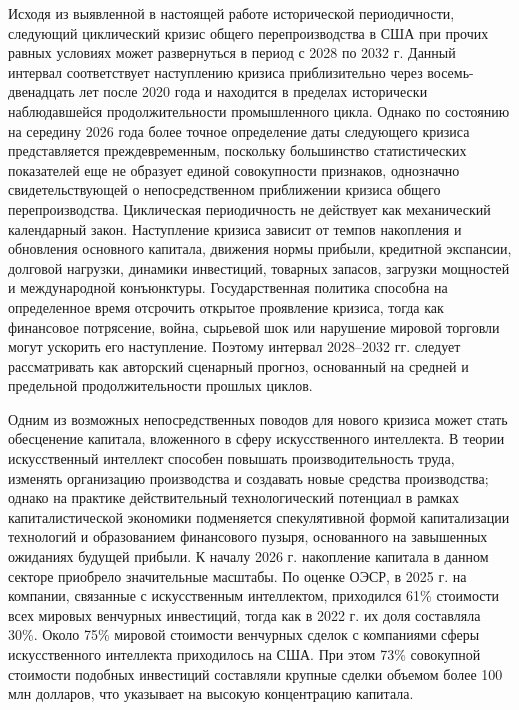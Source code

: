 Исходя из выявленной в настоящей работе исторической периодичности, следующий циклический кризис общего перепроизводства в США при прочих равных условиях может развернуться в период с 2028 по 2032 г. Данный интервал соответствует наступлению кризиса приблизительно через восемь-двенадцать лет после 2020 года и находится в пределах исторически наблюдавшейся продолжительности промышленного цикла. Однако по состоянию на середину 2026 года более точное определение даты следующего кризиса представляется преждевременным, поскольку большинство статистических показателей еще не образует единой совокупности признаков, однозначно свидетельствующей о непосредственном приближении кризиса общего перепроизводства. Циклическая периодичность не действует как механический календарный закон. Наступление кризиса зависит от темпов накопления и обновления основного капитала, движения нормы прибыли, кредитной экспансии, долговой нагрузки, динамики инвестиций, товарных запасов, загрузки мощностей и международной конъюнктуры. Государственная политика способна на определенное время отсрочить открытое проявление кризиса, тогда как финансовое потрясение, война, сырьевой шок или нарушение мировой торговли могут ускорить его наступление. Поэтому интервал 2028–2032 гг. следует рассматривать как авторский сценарный прогноз, основанный на средней и предельной продолжительности прошлых циклов.

Одним из возможных непосредственных поводов для нового кризиса может стать обесценение капитала, вложенного в сферу искусственного интеллекта. В теории искусственный интеллект способен повышать производительность труда, изменять организацию производства и создавать новые средства производства; однако на практике действительный технологический потенциал в рамках капиталистической экономики подменяется спекулятивной формой капитализации технологий и образованием финансового пузыря, основанного на завышенных ожиданиях будущей прибыли. К началу 2026 г. накопление капитала в данном секторе приобрело значительные масштабы. По оценке ОЭСР, в 2025 г. на компании, связанные с искусственным интеллектом, приходился 61\% стоимости всех мировых венчурных инвестиций, тогда как в 2022 г. их доля составляла 30\%. Около 75\% мировой стоимости венчурных сделок с компаниями сферы искусственного интеллекта приходилось на США. При этом 73\% совокупной стоимости подобных инвестиций составляли крупные сделки объемом более 100 млн долларов, что указывает на высокую концентрацию капитала.

